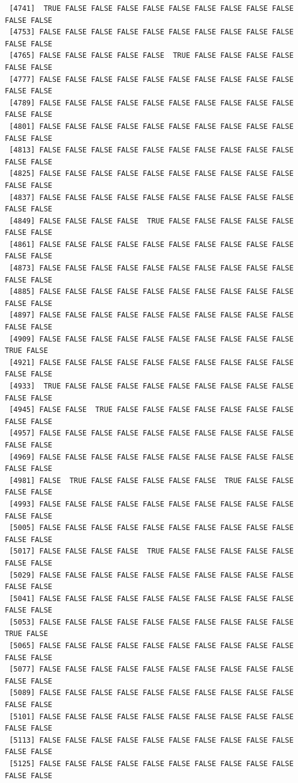 \documentclass[
  a4paper,
  DIV=11,
  numbers=noendperiod]{scrartcl}
\begin{document}
\begin{verbatim}
 [4741]  TRUE FALSE FALSE FALSE FALSE FALSE FALSE FALSE FALSE FALSE FALSE FALSE
 [4753] FALSE FALSE FALSE FALSE FALSE FALSE FALSE FALSE FALSE FALSE FALSE FALSE
 [4765] FALSE FALSE FALSE FALSE FALSE  TRUE FALSE FALSE FALSE FALSE FALSE FALSE
 [4777] FALSE FALSE FALSE FALSE FALSE FALSE FALSE FALSE FALSE FALSE FALSE FALSE
 [4789] FALSE FALSE FALSE FALSE FALSE FALSE FALSE FALSE FALSE FALSE FALSE FALSE
 [4801] FALSE FALSE FALSE FALSE FALSE FALSE FALSE FALSE FALSE FALSE FALSE FALSE
 [4813] FALSE FALSE FALSE FALSE FALSE FALSE FALSE FALSE FALSE FALSE FALSE FALSE
 [4825] FALSE FALSE FALSE FALSE FALSE FALSE FALSE FALSE FALSE FALSE FALSE FALSE
 [4837] FALSE FALSE FALSE FALSE FALSE FALSE FALSE FALSE FALSE FALSE FALSE FALSE
 [4849] FALSE FALSE FALSE FALSE  TRUE FALSE FALSE FALSE FALSE FALSE FALSE FALSE
 [4861] FALSE FALSE FALSE FALSE FALSE FALSE FALSE FALSE FALSE FALSE FALSE FALSE
 [4873] FALSE FALSE FALSE FALSE FALSE FALSE FALSE FALSE FALSE FALSE FALSE FALSE
 [4885] FALSE FALSE FALSE FALSE FALSE FALSE FALSE FALSE FALSE FALSE FALSE FALSE
 [4897] FALSE FALSE FALSE FALSE FALSE FALSE FALSE FALSE FALSE FALSE FALSE FALSE
 [4909] FALSE FALSE FALSE FALSE FALSE FALSE FALSE FALSE FALSE FALSE  TRUE FALSE
 [4921] FALSE FALSE FALSE FALSE FALSE FALSE FALSE FALSE FALSE FALSE FALSE FALSE
 [4933]  TRUE FALSE FALSE FALSE FALSE FALSE FALSE FALSE FALSE FALSE FALSE FALSE
 [4945] FALSE FALSE  TRUE FALSE FALSE FALSE FALSE FALSE FALSE FALSE FALSE FALSE
 [4957] FALSE FALSE FALSE FALSE FALSE FALSE FALSE FALSE FALSE FALSE FALSE FALSE
 [4969] FALSE FALSE FALSE FALSE FALSE FALSE FALSE FALSE FALSE FALSE FALSE FALSE
 [4981] FALSE  TRUE FALSE FALSE FALSE FALSE FALSE  TRUE FALSE FALSE FALSE FALSE
 [4993] FALSE FALSE FALSE FALSE FALSE FALSE FALSE FALSE FALSE FALSE FALSE FALSE
 [5005] FALSE FALSE FALSE FALSE FALSE FALSE FALSE FALSE FALSE FALSE FALSE FALSE
 [5017] FALSE FALSE FALSE FALSE  TRUE FALSE FALSE FALSE FALSE FALSE FALSE FALSE
 [5029] FALSE FALSE FALSE FALSE FALSE FALSE FALSE FALSE FALSE FALSE FALSE FALSE
 [5041] FALSE FALSE FALSE FALSE FALSE FALSE FALSE FALSE FALSE FALSE FALSE FALSE
 [5053] FALSE FALSE FALSE FALSE FALSE FALSE FALSE FALSE FALSE FALSE  TRUE FALSE
 [5065] FALSE FALSE FALSE FALSE FALSE FALSE FALSE FALSE FALSE FALSE FALSE FALSE
 [5077] FALSE FALSE FALSE FALSE FALSE FALSE FALSE FALSE FALSE FALSE FALSE FALSE
 [5089] FALSE FALSE FALSE FALSE FALSE FALSE FALSE FALSE FALSE FALSE FALSE FALSE
 [5101] FALSE FALSE FALSE FALSE FALSE FALSE FALSE FALSE FALSE FALSE FALSE FALSE
 [5113] FALSE FALSE FALSE FALSE FALSE FALSE FALSE FALSE FALSE FALSE FALSE FALSE
 [5125] FALSE FALSE FALSE FALSE FALSE FALSE FALSE FALSE FALSE FALSE FALSE FALSE

\end{verbatim}
\end{document}
